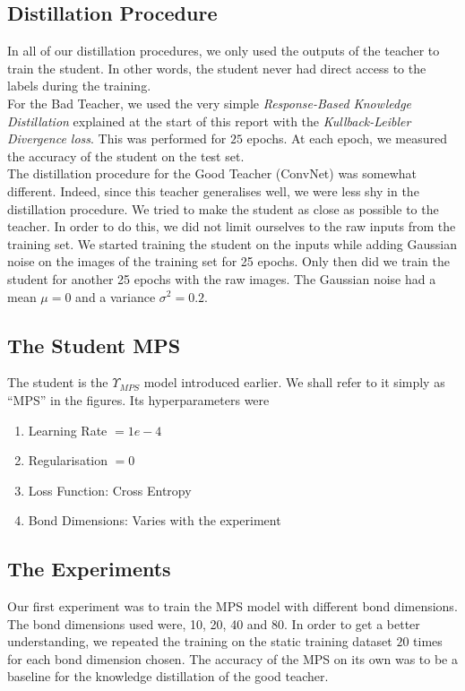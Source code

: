 \documentclass{article}
\theoremstyle{definition}
\theoremstyle{definition}
\begin{document}
\subsection{Distillation Procedure}
In all of our distillation procedures, we only used the outputs of the teacher to train the student. In other words, the student never had direct access to the labels during the training. \\

For the Bad Teacher, we used the very simple \emph{Response-Based Knowledge Distillation} explained at the start of this report with the \emph{Kullback-Leibler Divergence loss}. This was performed for $25$ epochs. At each epoch, we measured the accuracy of the student on the test set. \\

The distillation procedure for the Good Teacher (ConvNet) was somewhat different. Indeed, since this teacher generalises well, we were less shy in the distillation procedure. We tried to make the student as close as possible to the teacher. In order to do this, we did not limit ourselves to the raw inputs from the training set. We started training the student on the inputs while adding Gaussian noise on the images of the training set for 25 epochs. Only then did we train the student for another 25 epochs with the raw images. The Gaussian noise had a mean $\mu=0$ and a variance $\sigma^2=0.2$.


\subsection{The Student MPS}
The student is the $\Upsilon_{MPS}$ model introduced earlier. We shall refer to it simply as \enquote{MPS} in the figures.
Its hyperparameters were
\begin{enumerate}
    \item Learning Rate $= 1e-4$
    \item Regularisation $= 0$
    \item Loss Function: Cross Entropy
    \item Bond Dimensions: Varies with the experiment
\end{enumerate}

\subsection{The Experiments}
Our first experiment was to train the MPS model with different bond dimensions. The bond dimensions used were, 10, 20, 40 and 80. In order to get a better understanding, we repeated the training on the static training dataset $20$ times for each bond dimension chosen. The accuracy of the MPS on its own was to be a baseline for the knowledge distillation of the good teacher.
\end{document}
